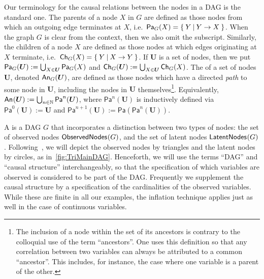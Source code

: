 \documentclass[aps,english,superscriptaddress,onecolumn,twoside,longbibliography,pra,floatfix,fleqn,nofootinbib]{revtex4-1}%
\newcommand*{\tblue}[1]{{\color{MidnightBlue}{\textbf{#1}}}}
\theoremstyle{definition}
\newcommand{\An}[2][]{{\mathsf{An}_{#1}}\parenths{#2}}
\newcommand{\Pa}[2][]{{\mathsf{Pa}_{#1}}\parenths{#2}}
\newcommand{\Ch}[2][]{{\mathsf{Ch}_{#1}}\parenths{#2}}
\newcommand{\SmallNamedFunction}[3][]{\operatorname{\mathsf{#2}}_{#1}\parenths{#3}}
\newcommand{\obsnodes}[1]{\SmallNamedFunction{ObservedNodes}{#1}}
\newcommand{\latnodes}[1]{\SmallNamedFunction{LatentNodes}{#1}}
\DeclarePairedDelimiter{\parenths}{\lparen}{\rparen}
\begin{document}
Our terminology for the causal relations between the nodes in a DAG is the standard one. The parents of a node $X$ in $G$ are defined as those nodes from which an outgoing edge terminates at $X$, i.e.~$\Pa[G]{X} = \{\:Y\:|\:Y\to X\:\}$. When the graph $G$ is clear from the context, then we also omit the subscript. Similarly, the children of a node $X$ are defined as those nodes at which edges originating at $X$ terminate, i.e.~$\Ch[G]{X} = \{\:Y\:|\: X\to Y\:\}$. If $\bm{U}$ is a set of nodes, then we put $\Pa[G]{\bm{U}} := \bigcup_{X\in\bm{U}} \Pa[G]{X}$ and $\Ch[G]{\bm{U}} := \bigcup_{X\in\bm{U}} \Ch[G]{X}$. The \tblue{ancestors} of a set of nodes $\bm{U}$, denoted $\An[G]{\bm{U}}$, are defined as those nodes which have a directed \emph{path} to some node in $\bm{U}$, including the nodes in $\bm{U}$ themselves\footnote{The inclusion of a node within the set of its ancestors is contrary to the colloquial use of the term ``ancestors''. 
One uses this definition so that any correlation between two variables can always be attributed to a common ``ancestor''. This includes, for instance, the case where one variable is a parent of the other.
}. 
Equivalently, $\An{\bm{U}} := \bigcup_{n\in\mathbb{N}} \mathsf{Pa}^n(\bm{U})$, where $\mathsf{Pa}^n(\bm{U})$ is inductively defined via $\mathsf{Pa}^0(\bm{U}) := \bm{U}$ and $\mathsf{Pa}^{n+1}(\bm{U}) := \mathsf{Pa}(\mathsf{Pa}^n(\bm{U}))$. 

A \tblue{causal structure} is a DAG $G$ that incorporates a distinction between two types of nodes: the set of observed nodes $\obsnodes{G}$, and the set of latent nodes $\latnodes{G}$.  %
Following~\cite{pusey2014gdag}, we will depict the observed nodes by triangles and the latent nodes by circles, as in~\cref{fig:TriMainDAG}.
Henceforth, we will use the terms ``DAG'' and ``causal structure'' interchangeably, so that the specification of which variables are observed is considered to be part of the DAG.
Frequently we supplement the causal structure by a specification of the cardinalities of the observed variables. While these are finite in all our examples, the inflation technique applies just as well in the case of continuous variables.
\end{document}
